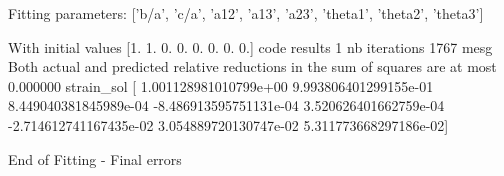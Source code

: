 \documentclass[letterpaper,10pt,english]{sphinxmanual}
\begin{document}
\begin{sphinxalltt}
\sphinxstylestrong{***********************}



\sphinxstylestrong{***********************}
Fitting parameters:   {[}'b/a', 'c/a', 'a12', 'a13', 'a23', 'theta1', 'theta2', 'theta3'{]}

\sphinxstylestrong{***********************}

With initial values {[}1. 1. 0. 0. 0. 0. 0. 0.{]}
code results 1
nb iterations 1767
mesg Both actual and predicted relative reductions in the sum of squares
  are at most 0.000000
strain\_sol {[} 1.001128981010799e+00  9.993806401299155e-01  8.449040381845989e-04
 -8.486913595751131e-04  3.520626401662759e-04 -2.714612741167435e-02
  3.054889720130747e-02  5.311773668297186e-02{]}


 \sphinxstylestrong{**********}  End of Fitting  -  Final errors  \sphinxstylestrong{**************}



\end{sphinxalltt}
\end{document}
